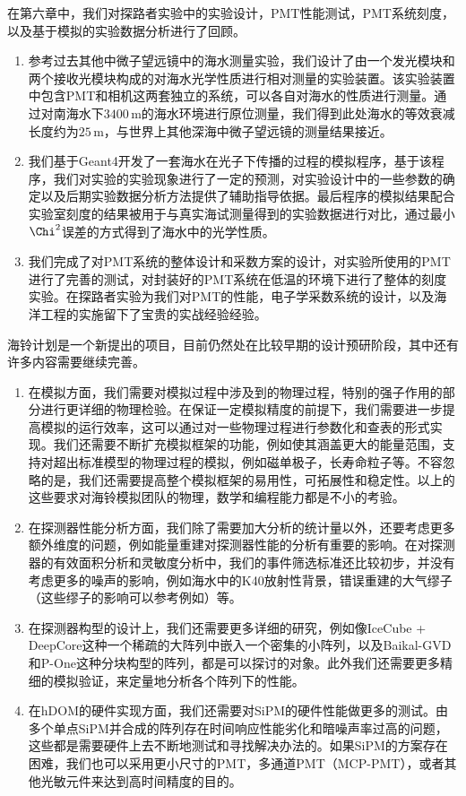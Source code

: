 在第六章中，我们对探路者实验中的实验设计，PMT性能测试，PMT系统刻度，以及基于模拟的实验数据分析进行了回顾。
\begin{enumerate}
    \item 参考过去其他中微子望远镜中的海水测量实验，我们设计了由一个发光模块和两个接收光模块构成的对海水光学性质进行相对测量的实验装置。该实验装置中包含PMT和相机这两套独立的系统，可以各自对海水的性质进行测量。通过对南海水下$3400\,\mathrm{m}$的海水环境进行原位测量，我们得到此处海水的等效衰减长度约为$25\,\mathrm{m}$，与世界上其他深海中微子望远镜的测量结果接近。
    \item 我们基于Geant4开发了一套海水在光子下传播的过程的模拟程序，基于该程序，我们对实验的实验现象进行了一定的预测，对实验设计中的一些参数的确定以及后期实验数据分析方法提供了辅助指导依据。最后程序的模拟结果配合实验室刻度的结果被用于与真实海试测量得到的实验数据进行对比，通过最小$\Chi^2$误差的方式得到了海水中的光学性质。
    \item 我们完成了对PMT系统的整体设计和采数方案的设计，对实验所使用的PMT进行了完善的测试，对封装好的PMT系统在低温的环境下进行了整体的刻度实验。在探路者实验为我们对PMT的性能，电子学采数系统的设计，以及海洋工程的实施留下了宝贵的实战经验经验。
\end{enumerate}

海铃计划是一个新提出的项目，目前仍然处在比较早期的设计预研阶段，其中还有许多内容需要继续完善。
\begin{enumerate}
    \item 在模拟方面，我们需要对模拟过程中涉及到的物理过程，特别的强子作用的部分进行更详细的物理检验。在保证一定模拟精度的前提下，我们需要进一步提高模拟的运行效率，这可以通过对一些物理过程进行参数化和查表的形式实现\cite{Kopper:2010}。我们还需要不断扩充模拟框架的功能，例如使其涵盖更大的能量范围，支持对超出标准模型的物理过程的模拟，例如磁单极子\cite{IceCube_monopole:2021}，长寿命粒子\cite{Ahlers_long_lived_particle:2006}等。不容忽略的是，我们还需要提高整个模拟框架的易用性，可拓展性和稳定性。以上的这些要求对海铃模拟团队的物理，数学和编程能力都是不小的考验。
    \item 在探测器性能分析方面，我们除了需要加大分析的统计量以外，还要考虑更多额外维度的问题，例如能量重建对探测器性能的分析有重要的影响\cite{IceCube_energy_reco:2013, KM3NeT_reco:2017}。在对探测器的有效面积分析和灵敏度分析中，我们的事件筛选标准还比较初步，并没有考虑更多的噪声的影响，例如海水中的K40放射性背景，错误重建的大气缪子（这些缪子的影响可以参考例如\cite{IceCube_atmos_neutrino_flux:2016, KM3NeT_sensitivity:2018}）等。
    \item 在探测器构型的设计上，我们还需要更多详细的研究，例如像IceCube + DeepCore\cite{IceCube_deepcore:2011}这种一个稀疏的大阵列中嵌入一个密集的小阵列，以及Baikal-GVD\cite{BAIKAL_design:1997}和P-One\cite{P-ONE:2020}这种分块构型的阵列，都是可以探讨的对象。此外我们还需要更多精细的模拟验证，来定量地分析各个阵列下的性能。
    \item 在hDOM的硬件实现方面，我们还需要对SiPM的硬件性能做更多的测试。由多个单点SiPM并合成的阵列存在时间响应性能劣化和暗噪声率过高的问题\cite{SiPM_measurement:2022}，这些都是需要硬件上去不断地测试和寻找解决办法的。如果SiPM的方案存在困难，我们也可以采用更小尺寸的PMT，多通道PMT（MCP-PMT）\cite{MCP-PMT:2022}，或者其他光敏元件\cite{LAPPD:2016}来达到高时间精度的目的。
\end{enumerate}

